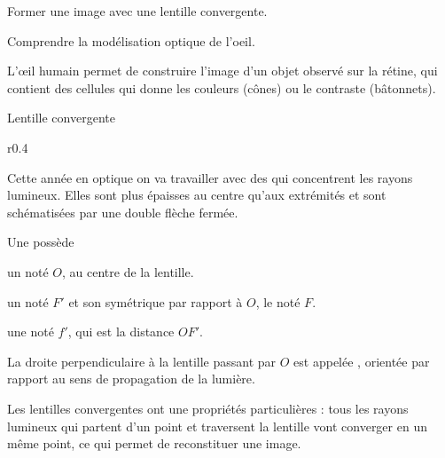\teteSndLumi
\vspace*{-30pt}

\vspace*{-12pt}
\begin{objectifs}
  \item Former une image avec une lentille convergente.
  \item Comprendre la modélisation optique de l'oeil.
\end{objectifs}

\begin{contexte}
  L’œil humain permet de construire l'image d'un objet observé sur la rétine, qui contient des cellules qui donne les couleurs (cônes) ou le contraste (bâtonnets).
  
\end{contexte}


\begin{doc}{Lentille convergente}
  \begin{wrapfigure}[4]{r}{0.4\linewidth}
    \centering
    \vspace*{-42pt}
  \end{wrapfigure}
  
  Cette année en optique on va travailler avec des  qui concentrent les rayons lumineux.
  Elles sont plus épaisses au centre qu'aux extrémités et sont schématisées par une double flèche fermée.

  \begin{importants}
    Une  possède
    \begin{listePoints}
      \item un  noté $O$, au centre de la lentille. 
      \item un  noté $F'$ et son symétrique par rapport à $O$, le  noté $F$.
      \item une  noté $f'$, qui est la distance $OF'$.
    \end{listePoints}
    
    La droite perpendiculaire à la lentille passant par $O$ est appelée , orientée par rapport au sens de propagation de la lumière.
  \end{importants}

  Les lentilles convergentes ont une propriétés particulières : tous les rayons lumineux qui partent d'un point et traversent la lentille vont converger en un même point, ce qui permet de reconstituer une image.
\end{doc}

